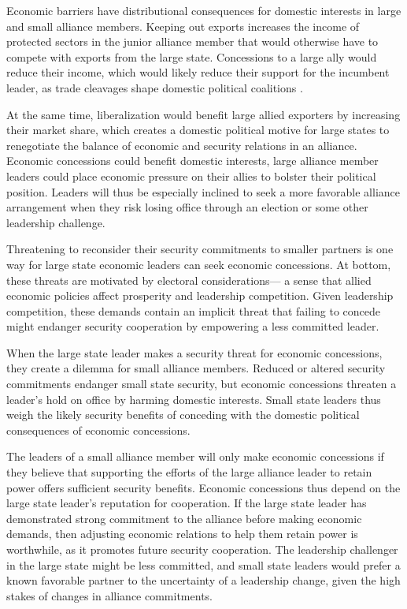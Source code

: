 \documentclass[12pt]{article}
\begin{document}
Economic barriers have distributional consequences for domestic interests in large and small alliance members.
Keeping out exports increases the income of protected sectors in the junior alliance member that would otherwise have to compete with exports from the large state.
Concessions to a large ally would reduce their income, which would likely reduce their support for the incumbent leader, as trade cleavages shape domestic political coalitions \citep{Rogowski1987, Hiscox2001}. 


At the same time, liberalization would benefit large allied exporters by increasing their market share, which creates a domestic political motive for large states to renegotiate the balance of economic and security relations in an alliance. 
Economic concessions could benefit domestic interests, large alliance member leaders could place economic pressure on their allies to bolster their political position. 
Leaders will thus be especially inclined to seek a more favorable alliance arrangement when they risk losing office through an election or some other leadership challenge. 


Threatening to reconsider their security commitments to smaller partners is one way for large state economic leaders can seek economic concessions.
At bottom, these threats are motivated by electoral considerations--- a sense that allied economic policies affect prosperity and leadership competition. 
Given leadership competition, these demands contain an implicit threat that failing to concede might endanger security cooperation by empowering a less committed leader.


When the large state leader makes a security threat for economic concessions, they create a dilemma for small alliance members. 
Reduced or altered security commitments endanger small state security, but economic concessions threaten a leader's hold on office by harming domestic interests. 
Small state leaders thus weigh the likely security benefits of conceding with the domestic political consequences of economic concessions.


The leaders of a small alliance member will only make economic concessions if they believe that supporting the efforts of the large alliance leader to retain power offers sufficient security benefits. 
Economic concessions thus depend on the large state leader's reputation for cooperation. 
If the large state leader has demonstrated strong commitment to the alliance before making economic demands, then adjusting economic relations to help them retain power is worthwhile, as it promotes future security cooperation. 
The leadership challenger in the large state might be less committed, and small state leaders would prefer a known favorable partner to the uncertainty of a leadership change, given the high stakes of changes in alliance commitments.
\end{document}
